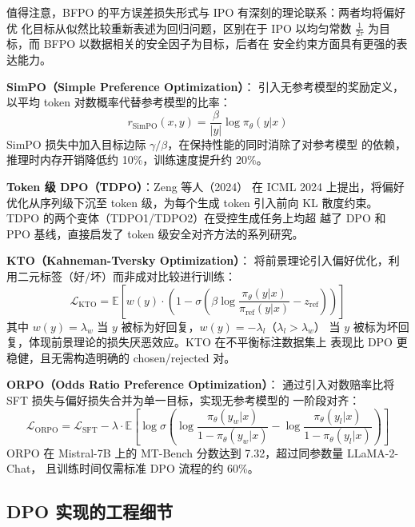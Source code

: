 \documentclass[12pt,a4paper,UTF8]{ctexart}
\newcommand{\E}{\mathbb{E}}
\newcommand{\piref}{\pi_{\mathrm{ref}}}
\newcommand{\pitheta}{\pi_{\theta}}
\begin{document}
值得注意，BFPO 的平方误差损失形式与 IPO 有深刻的理论联系：两者均将偏好优
化目标从似然比较重新表述为回归问题，区别在于 IPO 以均匀常数
$\frac{1}{2\tau}$ 为目标，而 BFPO 以数据相关的安全因子为目标，后者在
安全约束方面具有更强的表达能力。

\noindent\textbf{SimPO（Simple Preference Optimization）}\cite{meng2024simpo}：
引入无参考模型的奖励定义，以平均 token 对数概率代替参考模型的比率：
\begin{equation}
  r_{\mathrm{SimPO}}(x,y) = \frac{\beta}{|y|}\log\pitheta(y|x)
\end{equation}
SimPO 损失中加入目标边际 $\gamma/\beta$，在保持性能的同时消除了对参考模型
的依赖，推理时内存开销降低约 10\%，训练速度提升约 20\%。

\noindent\textbf{Token 级 DPO（TDPO）}\cite{zeng2024tdpo}：Zeng 等人（2024）
在 ICML 2024 上提出，将偏好优化从序列级下沉至 token 级，为每个生成 token
引入前向 KL 散度约束。TDPO 的两个变体（TDPO1/TDPO2）在受控生成任务上均超
越了 DPO 和 PPO 基线，直接启发了 token 级安全对齐方法的系列研究。

\noindent\textbf{KTO（Kahneman-Tversky Optimization）}\cite{ethayarajh2024kto}：
将前景理论引入偏好优化，利用二元标签（好/坏）而非成对比较进行训练：
\begin{equation}
  \mathcal{L}_{\mathrm{KTO}}
    = \E\!\left[w(y)\cdot\left(
        1 - \sigma\!\left(\beta\log\frac{\pitheta(y|x)}{\piref(y|x)} - z_{\mathrm{ref}}\right)
      \right)\right]
\end{equation}
其中 $w(y) = \lambda_w$ 当 $y$ 被标为好回复，$w(y) = -\lambda_l$（$\lambda_l >\lambda_w$）
当 $y$ 被标为坏回复，体现前景理论的损失厌恶效应。KTO 在不平衡标注数据集上
表现比 DPO 更稳健，且无需构造明确的 chosen/rejected 对。

\noindent\textbf{ORPO（Odds Ratio Preference Optimization）}\cite{hong2024orpo}：
通过引入对数赔率比将 SFT 损失与偏好损失合并为单一目标，实现无参考模型的
一阶段对齐：
\begin{equation}
  \mathcal{L}_{\mathrm{ORPO}}
    = \mathcal{L}_{\mathrm{SFT}}
      - \lambda\cdot\E\!\left[
          \log\sigma\!\left(
            \log\frac{\pitheta(y_w|x)}{1-\pitheta(y_w|x)}
            - \log\frac{\pitheta(y_l|x)}{1-\pitheta(y_l|x)}
          \right)
        \right]
\end{equation}
ORPO 在 Mistral-7B 上的 MT-Bench 分数达到 7.32，超过同参数量 LLaMA-2-Chat，
且训练时间仅需标准 DPO 流程的约 60\%。

\subsection{DPO 实现的工程细节}
\end{document}
